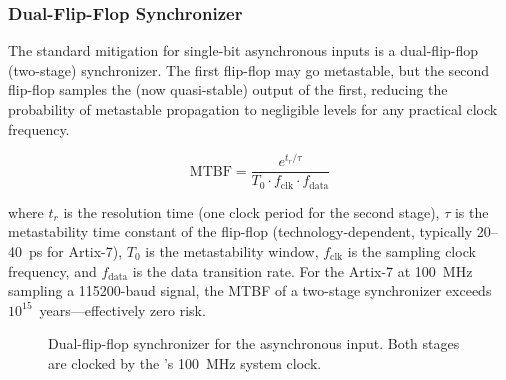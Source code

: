 \documentclass[11pt,letterpaper]{article}
\begin{document}
	\subsubsection{Dual-Flip-Flop Synchronizer}

	The standard mitigation for single-bit asynchronous inputs is a dual-flip-flop (two-stage) synchronizer. The first flip-flop may go metastable, but the second flip-flop samples the (now quasi-stable) output of the first, reducing the probability of metastable propagation to negligible levels for any practical clock frequency.

	\begin{equation}
		\text{MTBF} = \frac{e^{t_r / \tau}}{T_0 \cdot f_{\text{clk}} \cdot f_{\text{data}}}
		\label{eq:mtbf}
	\end{equation}

	where $t_r$ is the resolution time (one clock period for the second stage), $\tau$ is the metastability time constant of the flip-flop (technology-dependent, typically 20--40~ps for Artix-7), $T_0$ is the metastability window, $f_{\text{clk}}$ is the sampling clock frequency, and $f_{\text{data}}$ is the data transition rate. For the Artix-7 at 100~MHz sampling a 115200-baud signal, the MTBF of a two-stage synchronizer exceeds $10^{15}$~years---effectively zero risk.

	\begin{figure}[ht!]
		\centering
		\caption{Dual-flip-flop synchronizer for the asynchronous \UART{} input. Both stages are clocked by the \FPGA{}'s 100~MHz system clock.}
		\label{fig:synchronizer}
	\end{figure}
\end{document}
